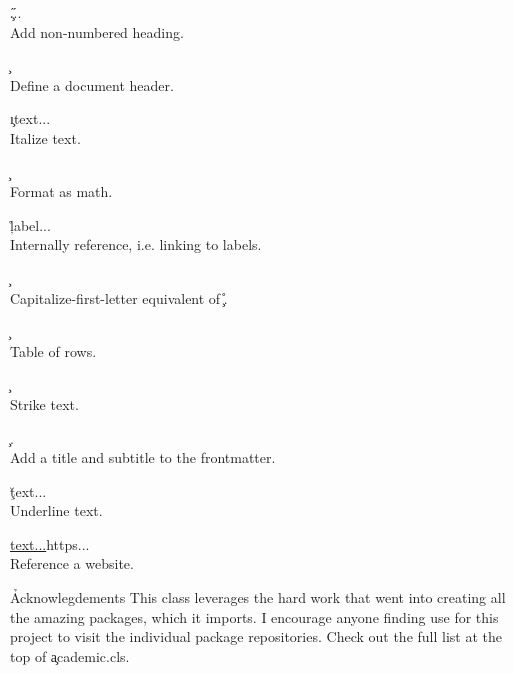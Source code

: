 \documentclass[twocolumn]{paper}
\begin{document}
\begin{bullets}
    \item \c{\H{...}} \\
    Add non-numbered heading.
    \item \c{} \\
    Define a document header.
    \item \c{\i{text...}} \\
    Italize text.
    \item \c{} \\
    Format as math.
    \item \c{\r{label...}} \\
    Internally reference, i.e. linking to labels.
    \item \c{} \\
    Capitalize-first-letter equivalent of \c{\r{}}.
    \item \c{} \\
    Table of rows.
    \item \c{} \\
    Strike text.
    \item \c{}. \\
    Add a title and subtitle to the frontmatter.
    \item \c{\u{text...}} \\
    Underline text.
    \item \c{\url{text...}{https...}} \\
    Reference a website.
\end{bullets}

\h*{Acknowlegdements}
This class leverages the hard work that went into creating all the amazing packages, which it imports. I encourage anyone finding use for this project to visit the individual package repositories. Check out the full list at the top of \c{academic.cls}.

\end{document}
